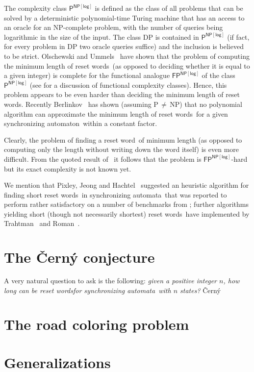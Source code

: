 \documentclass{irmaart}
\newcommand{\sa}{synchronizing au\-tom\-a\-ta}
\newcommand{\san}{synchronizing au\-tom\-a\-ton}
\newcommand{\sw}{reset word}
\newcommand{\sws}{reset words}
\begin{document}
The complexity class $\mathsf{P}^\mathsf{NP[log]}$ is defined as
the class of all problems that can be solved by a deterministic
polynomial-time Turing machine that has an access to an oracle for
an \textsf{NP}-complete problem, with the number of queries being
logarithmic in the size of the input. The class \textsf{DP} is
contained in $\mathsf{P}^\mathsf{NP[log]}$ (if fact, for every
problem in \textsf{DP} two oracle queries suffice) and the
inclusion is believed to be strict. Olschewski and
Ummels~\cite{Olschewski&Ummels:2010} have shown that the problem
of computing the minimum length of \sws\ (as opposed to deciding
whether it is equal to a given integer) is complete for the
functional analogue $\mathsf{FP}^\mathsf{NP[log]}$ of the class
$\mathsf{P}^\mathsf{NP[log]}$ (see \cite{Selman:1994} for a
discussion of functional complexity classes). Hence, this problem
appears to be even harder than deciding the minimum length of
\sws. Recently Berlinkov~\cite{Berlinkov:2010} has shown (assuming
\textsf{P}\,$\ne$\,\textsf{NP}) that no polynomial algorithm can
approximate the minimum length of \sws\ for a given \san\ within a
constant factor.

Clearly, the problem of finding a \sw\ of minimum length (as
opposed to computing only the length without writing down the word
itself) is even more difficult. From the quoted result
of~\cite{Olschewski&Ummels:2010} it follows that the problem is
$\mathsf{FP}^\mathsf{NP[log]}$-hard but its exact complexity is
not known yet.

We mention that Pixley, Jeong and
Hachtel~\cite{Pixley&Jeong&Hachtel:1992} suggested an heuristic
algorithm for finding short \sws\ in \sa\ that was reported to
perform rather satisfactory on a number of benchmarks from
\cite{Yang:1991}; further algorithms yielding short (though not
necessarily shortest) \sws\ have implemented by
Trahtman~\cite{Trahtman:2006} and Roman~\cite{Roman:2009}.

\section{The \v{C}ern\'{y} conjecture}

A very natural question to ask is the following: \emph{given a
positive integer $n$, how long can be \sws\s for \sa\ with $n$
states?} \v{C}ern\'{y}~\cite{Cerny:1964}

\section{The road coloring problem}

\section{Generalizations}


\begin{footnotesize}
  
\end{footnotesize}


\markright{\indexname}\markboth{\indexname}{\indexname}
\printindex
\end{document}
